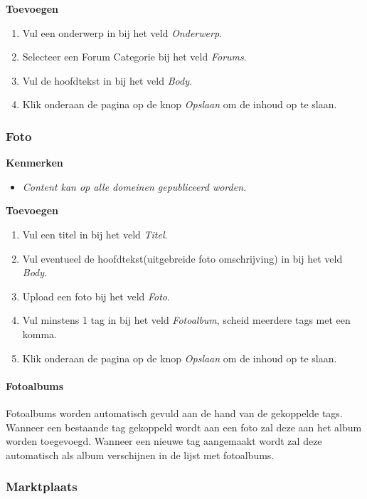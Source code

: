 \textbf{Toevoegen}

\begin{enumerate}
\item Vul een onderwerp in bij het veld \emph{Onderwerp}.
\item Selecteer een Forum Categorie bij het veld \emph{Forums}.
\item Vul de hoofdtekst in bij het veld \emph{Body}.
\item Klik onderaan de pagina op de knop \emph{Opslaan} om de inhoud op te slaan.
\end{enumerate}

\subsubsection{Foto}\label{foto}

\textbf{Kenmerken}

\begin{itemize}
\item \emph{Content kan op alle domeinen gepubliceerd worden.}
\end{itemize}

\textbf{Toevoegen}

\begin{enumerate}
\item Vul een titel in bij het veld \emph{Titel}.
\item Vul eventueel de hoofdtekst(uitgebreide foto omschrijving) in bij het veld \emph{Body}.
\item Upload een foto bij het veld \emph{Foto}.
\item Vul minstens 1 tag in bij het veld \emph{Fotoalbum}, scheid meerdere tags met een komma.
\item Klik onderaan de pagina op de knop \emph{Opslaan} om de inhoud op te slaan.
\end{enumerate}

\paragraph{Fotoalbums}
Fotoalbums worden automatisch gevuld aan de hand van de gekoppelde tags. Wanneer een bestaande tag gekoppeld wordt aan een foto zal deze aan het album worden toegevoegd. Wanneer een nieuwe tag aangemaakt wordt zal deze automatisch als album verschijnen in de lijst met fotoalbums.

\subsubsection{Marktplaats}\label{marktplaats}

